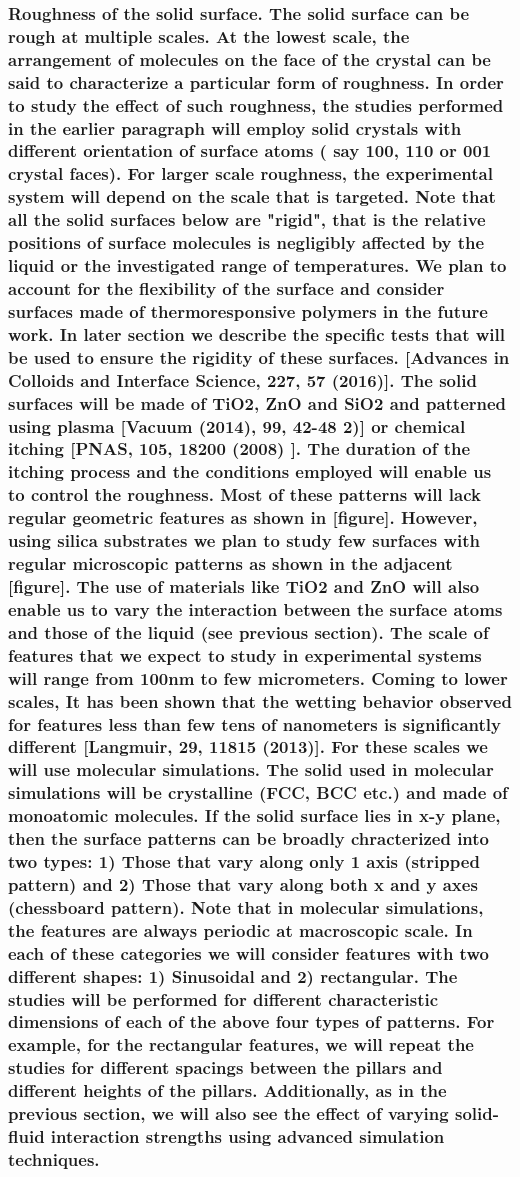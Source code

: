 \documentclass[a4paper,12pt,single,pdftex]{scrartcl}
\begin{document}
{\label{ID_708499358}\subsubsection{Roughness of the solid surface. The solid surface can be rough at multiple scales. At the lowest scale, the arrangement of molecules on the face of the crystal can be said to characterize a particular form of roughness. In order to study the effect of such roughness, the studies performed in the earlier paragraph will employ solid crystals with different orientation of surface atoms ( say 100, 110 or 001 crystal faces). For larger scale roughness, the experimental system will depend on the scale that is targeted. Note that all the solid surfaces below are "rigid", that is the relative positions of surface molecules is negligibly affected by the liquid or the investigated range of temperatures. We plan to account for the flexibility of the surface and consider surfaces made of thermoresponsive polymers in the future work. In later section we describe the specific tests that will be used to ensure the rigidity of these surfaces. [Advances in Colloids and Interface Science, 227, 57 (2016)]. The solid surfaces will be made of TiO2, ZnO and SiO2 and patterned using plasma [Vacuum (2014), 99, 42-48 2)] or chemical itching [PNAS, 105, 18200 (2008) ]. The duration of the itching process and the conditions employed will enable us to control the roughness. Most of these patterns will lack regular geometric features as shown in [figure]. However, using silica substrates we plan to study few surfaces with regular microscopic patterns as shown in the adjacent [figure]. The use of materials like TiO2 and ZnO will also enable us to vary the interaction between the surface atoms and those of the liquid (see previous section). The scale of features that we expect to study in experimental systems will range from 100nm to few micrometers. Coming to lower scales, It has been shown that the wetting behavior observed for features less than few tens of nanometers is significantly different [Langmuir, 29, 11815 (2013)]. For these scales we will use molecular simulations. The solid used in molecular simulations will be crystalline (FCC, BCC etc.) and made of monoatomic molecules. If the solid surface lies in x-y plane, then the surface patterns can be broadly chracterized into two types: 1) Those that vary along only 1 axis (stripped pattern) and 2) Those that vary along both x and y axes (chessboard pattern).  Note that in molecular simulations, the features are always periodic at macroscopic scale. In each of these categories we will consider features with two different shapes: 1) Sinusoidal and 2) rectangular. The studies will be performed for different characteristic dimensions of each of the above four types of patterns. For example, for the rectangular features, we will repeat the studies for different spacings between the pillars and different heights of the pillars.  Additionally, as in the previous section, we will also see the effect of varying solid-fluid interaction strengths using advanced simulation techniques.}

}
\end{document}
